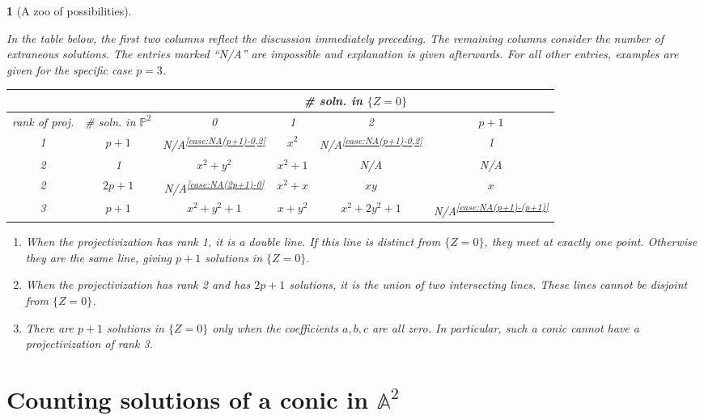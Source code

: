 \documentclass[10pt,a4paper]{amsart}
\numberwithin{equation}{section}
\numberwithin{figure}{section}
\theoremstyle{definition}
\theoremstyle{plain}
\newtheorem{example}[thm]{\protect\examplename}
\theoremstyle{remark}
\theoremstyle{plain}
\theoremstyle{definition}
\theoremstyle{plain}
\theoremstyle{plain}
\providecommand{\examplename}{Example}
\newcommand{\A}{\mathbb{A}}
\begin{document}
	\begin{example}[A zoo of possibilities]
		\label{exa:all-possibilities}
		
		In the table below, the first two columns reflect the discussion
		immediately preceding. The remaining columns consider the number of extraneous
		solutions. The entries marked ``N/A'' are impossible and explanation is given
		afterwards. For all other entries, examples are given for the specific case
		$p=3$.  
		\begin{center} %
			\begin{tabular}{|c|c||c|c|c|c|} \hline \multicolumn{2}{|c||}{} &
				\multicolumn{4}{c|}{\# soln. in $\{Z=0\}$}  \\ \hline
				rank of proj. & \# soln. in $\mathbb{P}^2$ & 0 & 1 & 2 & $p + 1$\\
				\hline \hline
				1 & $p+1$ & N/A\textsuperscript{\ref{case:NA(p+1)-0,2}} & $x^2$ & N/A\textsuperscript{\ref{case:NA(p+1)-0,2}} & 1 \\
				\hline
				2 & 1 & $x^2 + y^2$ & $x^2 + 1$ & N/A & N/A \\
				\hline
				2 &	$2p+1$ & N/A\textsuperscript{\ref{case:NA(2p+1)-0}} & $x^2 + x$ & $xy$ & $x$ \\
				\hline
				3 & $p+1$ & $x^2 + y^2 + 1$ & $x+y^2$ & $x^2 + 2y^2 + 1$ & N/A\textsuperscript{\ref{case:NA(p+1)-(p+1)}} \\
				\hline
			\end{tabular}
		\end{center} 
		\begin{enumerate}
			\item\label{case:NA(p+1)-0,2} When the projectivization has rank 1, it is a double line. If this
			line is distinct from $\{Z = 0\}$, they meet at exactly one point. 
			Otherwise they are the same line, giving $p+1$ solutions in $\{Z=0\}$. 
			\item\label{case:NA(2p+1)-0} When the projectivization has rank 2 and has $2p + 1$ solutions, it
			is the union of two intersecting lines. These lines cannot be disjoint 
			from $\{Z=0\}$.
			\item\label{case:NA(p+1)-(p+1)} There are $p+1$ solutions in $\{Z = 0\}$ only when the 
			coefficients $a,b,c$ are all zero. In particular, such a conic cannot 
			have a projectivization of rank 3.
		\end{enumerate} 
	\end{example}

    \section{Counting solutions of a conic in $\A^2$}
    \label{sec:affine-solutions}
	
\end{document}
